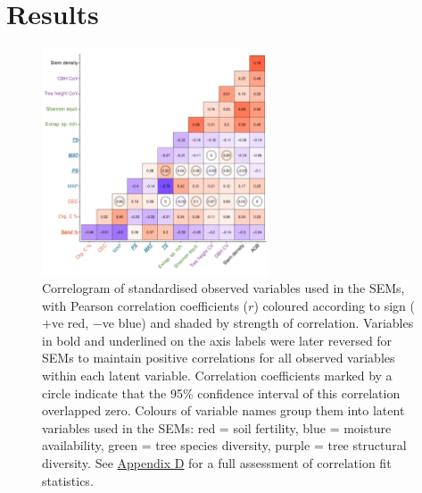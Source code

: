 \documentclass[11pt,a4paper]{article}
\begin{document}

\section{Results}

\begin{figure}[H]
\centering
	\includegraphics[width=0.6\textwidth]{corr_mat}
	\caption{Correlogram of standardised observed variables used in the SEMs, with Pearson correlation coefficients ($r$) coloured according to sign ($+$ve red, $-$ve blue) and shaded by strength of correlation. Variables in bold and underlined on the axis labels were later reversed for SEMs to maintain positive correlations for all observed variables within each latent variable. Correlation coefficients marked by a circle indicate that the 95\% confidence interval of this correlation overlapped zero. Colours of variable names group them into latent variables used in the SEMs: red = soil fertility, blue = moisture availability, green = tree species diversity, purple = tree structural diversity. See \hyperref[appendixd]{Appendix D} for a full assessment of correlation fit statistics.}
	\label{corr_mat}
\end{figure}
\end{document}
